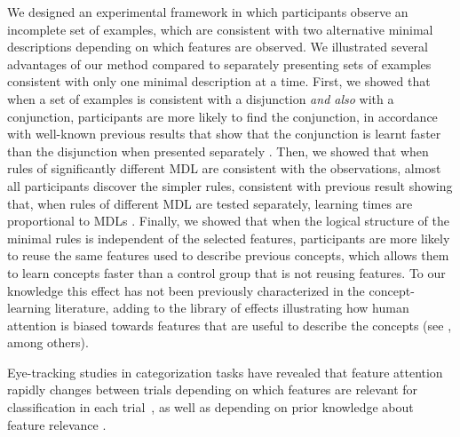 We designed an experimental framework in which participants observe an incomplete set of examples, which are consistent with two alternative minimal descriptions depending on which features are observed.  We illustrated several advantages of our method compared to separately presenting sets of examples consistent with only one minimal description at a time. First, we showed that when a set of examples is consistent with a disjunction \textit{and also} with a conjunction, participants are more likely to find the conjunction, in accordance with well-known previous results that show that the conjunction is learnt faster than the disjunction when presented separately \cite{bourne1970knowing}. Then, we showed that when rules of significantly different MDL are consistent with the observations, almost all participants discover the simpler rules, consistent with previous result showing that, when rules of different MDL are tested separately, learning times are proportional to MDLs \cite{feldman2000minimization}. Finally, we showed that when the logical structure of the minimal rules is independent of the selected features, participants are more likely to reuse the same features used to describe previous concepts, which allows them to learn concepts faster than a control group that is not reusing features. To our knowledge this effect has not been previously characterized in the concept-learning literature, adding to the library of effects illustrating how human attention is biased towards features that are useful to describe the concepts (see \cite{blair2009extremely,kruschke2000blocking,kruschke2005eye,hoffman2010costs}, among others).
\color{black}

Eye-tracking studies in categorization tasks have revealed that feature attention rapidly changes between trials depending on which features are relevant for classification in each trial~\cite{blair2009extremely}, as well as depending on prior knowledge about feature relevance \cite{kim2011prior}.  

